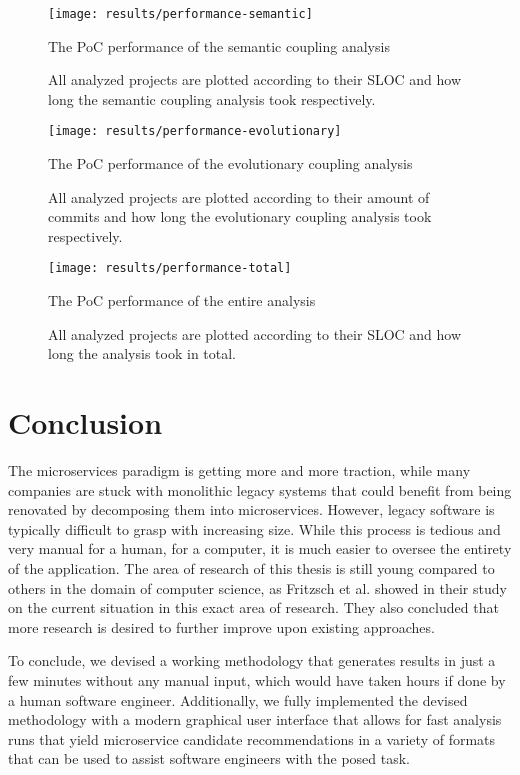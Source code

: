 \documentclass[12pt,a4paper]{report}
\begin{document}
\begin{figure}[htbp]
\centering
\texttt{[image: results/performance-semantic]}
\caption{The PoC performance of the semantic coupling analysis}
\caption*{\centering
  All analyzed projects are plotted according to their SLOC
  and how long the semantic coupling analysis took respectively.
}
\label{fig:performance-semantic}
\end{figure}

\begin{figure}[htbp]
\centering
\texttt{[image: results/performance-evolutionary]}
\caption{The PoC performance of the evolutionary coupling analysis}
\caption*{\centering
  All analyzed projects are plotted according to their amount of commits
  and how long the evolutionary coupling analysis took respectively.
}
\label{fig:performance-evolutionary}
\end{figure}

\begin{figure}[htbp]
\centering
\texttt{[image: results/performance-total]}
\caption{The PoC performance of the entire analysis}
\caption*{\centering
  All analyzed projects are plotted according to their SLOC
  and how long the analysis took in total.
}
\label{fig:performance-total}
\end{figure}




\chapter{Conclusion} \label{chap:conclusion}

The microservices paradigm is getting more and more traction, while many
companies are stuck with monolithic legacy systems that could benefit from
being renovated by decomposing them into microservices. However, legacy
software is typically difficult to grasp with increasing size. While this
process is tedious and very manual for a human, for a computer, it is much
easier to oversee the entirety of the application. The area of research of
this thesis is still young compared to others in the domain of computer
science, as Fritzsch et al. showed in their study on the current situation in
this exact area of research. They also concluded that more research is desired
to further improve upon existing approaches.

To conclude, we devised a working methodology that generates results in just a
few minutes without any manual input, which would have taken hours if done by a
human software engineer. Additionally, we fully implemented the devised
methodology with a modern graphical user interface that allows for fast
analysis runs that yield microservice candidate recommendations in a variety of
formats that can be used to assist software engineers with the posed task.
\end{document}
